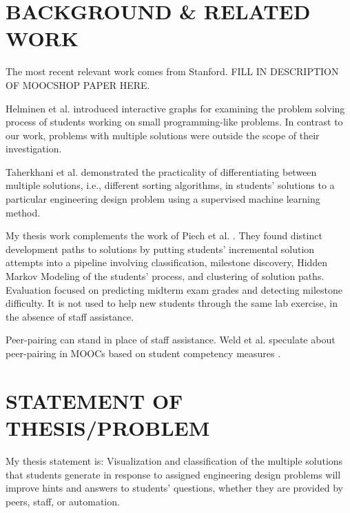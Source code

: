 \documentclass[12pt]{article}
\begin{document}
\section{BACKGROUND \& RELATED WORK}

The most recent relevant work comes from Stanford. {\color{red}FILL IN DESCRIPTION OF MOOCSHOP PAPER HERE.}

Helminen et al. \cite{ICERHelminen} introduced interactive graphs for examining the problem solving process of students working on small programming-like problems. In contrast to our work, problems with multiple solutions were outside the scope of their investigation.

Taherkhani et al. \cite{taherkhani12} demonstrated the practicality of differentiating between multiple solutions, i.e., different sorting algorithms, in students' solutions to a particular engineering design problem using a supervised machine learning method.

My thesis work complements the work of Piech et al. \cite{Piech}. They found distinct development paths to solutions by putting students' incremental solution attempts into a pipeline involving classification, milestone discovery, Hidden Markov Modeling of the students' process, and clustering of solution paths. Evaluation focused on predicting midterm exam grades and detecting milestone difficulty. It is not used to help new students through the same lab exercise, in the absence of staff assistance.

Peer-pairing can stand in place of staff assistance. Weld et al. speculate about peer-pairing in MOOCs based on student competency measures \cite{WeldHcomp12}.



\section{STATEMENT OF THESIS/PROBLEM}

My thesis statement is: Visualization and classification of the multiple solutions that students generate in response to assigned engineering design problems will improve hints and answers to students' questions, whether they are provided by peers, staff, or automation. 
\end{document}
